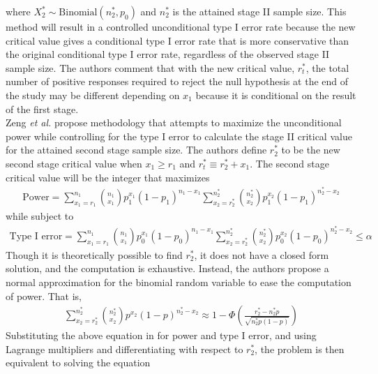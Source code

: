 \documentclass[12pt]{report}\usepackage[]{graphicx}\usepackage[]{color}
\newlength{\li}\setlength{\li}{14.48pt}
\newlength{\di}\setlength{\di}{-3.5mm}
\begin{document}
where $X_2^\ast \sim \mbox{Binomial}(n_2^\ast, p_0)$ and $n_2^\ast$ is the attained stage II sample size. This method will result in a controlled unconditional type I error rate because the new critical value gives a conditional type I error rate that is more conservative than the original conditional type I error rate, regardless of the observed stage II sample size. The authors comment that with the new critical value, $r_t^\ast$, the total number of positive responses required to reject the null hypothesis at the end of the study may be different depending on $x_1$ because it is conditional on the result of the first stage. \\
\indent Zeng \textit{et al.} \cite{Zeng} propose methodology that attempts to maximize the unconditional power while controlling for the type I error to calculate the stage II critical value for the attained second stage sample size. The authors define $r_2^\ast$ to be the new second stage critical value when $x_1 \geq r_1$ and $r_t^\ast \equiv r_2^\ast + x_1$. The second stage critical value will be the integer that maximizes 
\begin{equation}
\begin{aligned}
\mbox{Power} = \sum_{x_1 = r_1}^{n_1} {n_1 \choose x_1} p_1^{x_1} (1-p_1)^{n_1 - x_1} \sum_{x_2 = r_2^\ast}^{n_2^\ast} {n_2^\ast \choose x_2} p_1^{x_2} (1-p_1)^{{n_2^\ast}-x_2}
\end{aligned}
\end{equation}
while subject to 
\begin{equation}
\begin{aligned}
 \mbox{Type I error} = \sum_{x_1 = r_1}^{n_1} {n_1 \choose x_1} p_0^{x_1} (1-p_0)^{n_1 - x_1} \sum_{x_2 = r_2^\ast}^{n_2^\ast} {n_2^\ast \choose x_2} p_0^{x_2}(1-p_0)^{{n_2^\ast}-x_2} \leq \alpha
\end{aligned}
\end{equation}
Though it is theoretically possible to find $r_2^\ast$, it does not have a closed form solution, and the computation is exhaustive. Instead, the authors propose a normal approximation for the binomial random variable to ease the computation of power. That is, 
\begin{equation}
\begin{aligned}
\sum_{x_2 = r_2^\ast}^{n_2^\ast} {n_2^\ast \choose x_2} p^{x_2} (1-p)^{n_2^\ast - x_2} \approx 1-\Phi \left(\frac{r_2^\ast - n_2^\ast p}{\sqrt{n_2^\ast p(1-p)}} \right)
\end{aligned}
\end{equation}
Substituting the above equation in for power and type I error, and using Lagrange multipliers and differentiating with respect to $r_2^\ast$, the problem is then equivalent to solving the equation 
\end{document}
